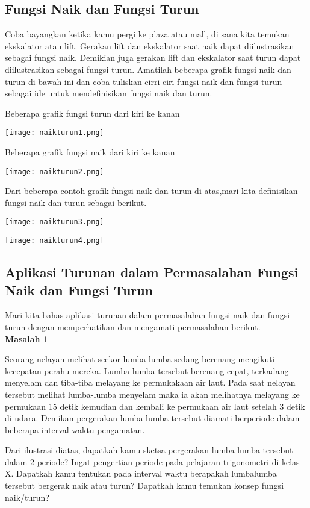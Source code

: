 \documentclass[11pt,fleqn]{book} %
\begin{document}
\subsection{Fungsi Naik dan Fungsi Turun}
Coba bayangkan ketika kamu pergi ke plaza atau mall, di sana kita temukan ekskalator atau lift. Gerakan lift dan ekskalator saat naik dapat diilustrasikan sebagai fungsi naik. Demikian juga gerakan lift dan ekskalator saat turun dapat diilustrasikan sebagai fungsi turun. Amatilah beberapa grafik fungsi naik dan turun di bawah ini dan coba tuliskan cirri-ciri fungsi naik dan fungsi turun sebagai ide untuk mendefinisikan fungsi naik dan turun.

Beberapa grafik fungsi turun dari kiri ke kanan

\texttt{[image: naikturun1.png]}

Beberapa grafik fungsi naik dari kiri ke kanan

\texttt{[image: naikturun2.png]}

Dari beberapa contoh grafik fungsi naik dan turun di atas,mari kita definisikan fungsi naik dan turun sebagai berikut.

\texttt{[image: naikturun3.png]}

\texttt{[image: naikturun4.png]}

\subsection{Aplikasi Turunan dalam Permasalahan Fungsi Naik dan Fungsi Turun}

Mari kita bahas aplikasi turunan dalam permasalahan fungsi naik dan fungsi turun dengan memperhatikan dan mengamati permasalahan berikut.\\

\textbf{Masalah 1}

Seorang nelayan melihat seekor lumba-lumba sedang berenang mengikuti kecepatan perahu mereka. Lumba-lumba tersebut berenang cepat, terkadang menyelam dan tiba-tiba melayang ke permukakaan air laut. Pada saat nelayan tersebut melihat lumba-lumba menyelam maka ia akan melihatnya melayang ke permukaan 15 detik kemudian dan kembali ke permukaan air laut setelah 3 detik di udara. Demikan pergerakan lumba-lumba tersebut diamati berperiode dalam beberapa interval waktu pengamatan.

Dari ilustrasi diatas, dapatkah kamu sketsa pergerakan lumba-lumba tersebut dalam 2 periode? Ingat pengertian periode pada pelajaran trigonometri di kelas X. Dapatkah kamu tentukan pada interval waktu berapakah lumbalumba tersebut bergerak naik atau turun? Dapatkah kamu temukan konsep fungsi naik/turun?\\
\end{document}
